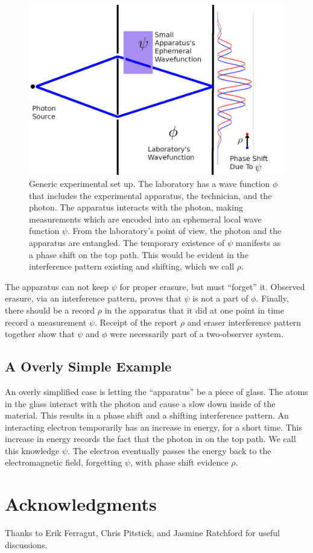 \documentclass[12pt,a4paper]{article}
\theoremstyle{myrule}
\theoremstyle{postulate}
\theoremstyle{definition}
\begin{document}
\begin{figure}[h]
\centering
\includegraphics[scale=1.3]{experiment.png}
\caption{Generic experimental set up.  The laboratory has a wave function $\phi$ that includes the experimental apparatus, the technician, and the photon.  The apparatus interacts with the photon, making measurements which are encoded into an ephemeral local wave function $\psi$.  From the laboratory's point of view, the photon and the apparatus are entangled.  The temporary existence of $\psi$ manifests as a phase shift on the top path.  This would be evident in the interference pattern existing and shifting, which we call $\rho$.}
\label{anb}
\end{figure}

The apparatus can not keep $\psi$ for proper erasure, but must ``forget'' it.  Observed erasure, via an interference pattern, proves that $\psi$ is not a part of $\phi$.  Finally, there should be a record $\rho$ in the apparatus that it did at one point in time record a measurement $\psi$.  Receipt of the report $\rho$ and eraser interference pattern together show that $\psi$ and $\phi$ were necessarily part of a two-observer system.

\subsection{A Overly Simple Example}
An overly simplified case is letting the ``apparatus'' be a piece of glass.  The atoms in the glass interact with the photon and cause a slow down inside of the material.  This results in a phase shift and a shifting interference pattern.  An interacting electron temporarily has an increase in energy, for a short time.  This increase in energy records the fact that the photon in on the top path.  We call this knowledge $\psi$.  The electron eventually passes the energy back to the electromagnetic field, forgetting $\psi$, with phase shift evidence $\rho$.

\section{Acknowledgments}
Thanks to Erik Ferragut, Chris Pitstick, and Jasmine Ratchford for useful discussions.



\end{document}
